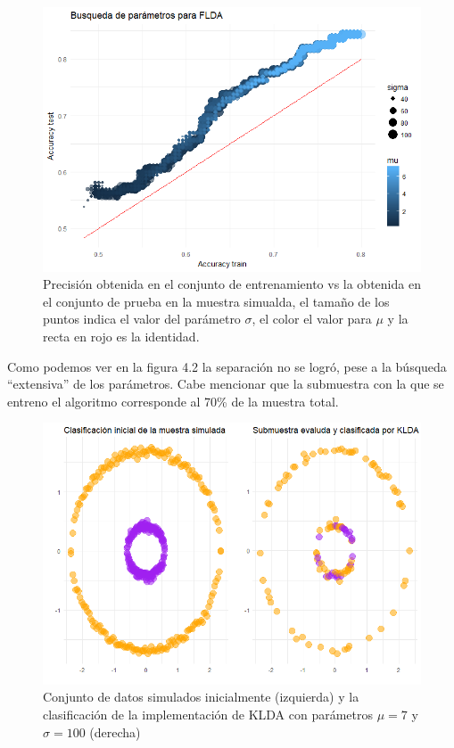 \documentclass[paper=letter, fontsize=11pt]{scrartcl}
\numberwithin{equation}{section} %
\numberwithin{figure}{section} %
\numberwithin{table}{section} %
\begin{document}
\begin{figure}[H]
  \begin{center}
    \includegraphics[scale=0.65]{grid_donas.png}
    \caption{Precisión obtenida en el conjunto de entrenamiento vs la obtenida en el conjunto de prueba en la muestra simualda, el tamaño de los puntos indica el valor del parámetro $\sigma$, el color el valor para $\mu$ y la recta en rojo es la identidad.   }
    \label{figura4_2}
  \end{center}
\end{figure}


Como podemos ver en la figura 4.2 la separación no se logró, pese a la búsqueda “extensiva” de los parámetros. Cabe mencionar que la submuestra con la que se entreno el algoritmo corresponde al 70\% de la muestra total. 

\begin{figure}[H]
  \begin{center}
    \includegraphics[scale=0.4]{donas_kernel.png}
    \caption{Conjunto de datos simulados inicialmente (izquierda) y la clasificación de la implementación de KLDA con parámetros $\mu = 7$ y $\sigma = 100$ (derecha)  }
    \label{figura4_2}
  \end{center}
\end{figure}
\end{document}

